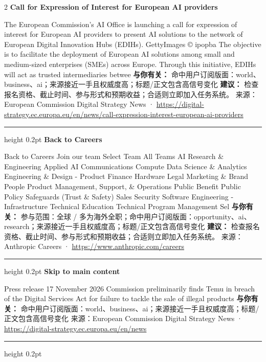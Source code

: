 \documentclass[10.5pt]{ctexart}
\begin{document}
\begin{multicols}{2}
{\large\bfseries Call for Expression of Interest for European AI providers}\par
The European Commission’s AI Office is launching a call for expression of interest for European AI providers to present AI solutions to the network of European Digital Innovation Hubs (EDIHs). GettyImages © ipopba The objective is to facilitate the deployment of European AI solutions among small and medium-sized enterprises (SMEs) across Europe. Through this initiative, EDIHs will act as trusted intermediaries betwee
\textbf{与你有关：} 命中用户订阅版面：world、business、ai；来源接近一手且权威度高；标题/正文包含高信号变化
\textbf{建议：} 检查报名资格、截止时间、参与形式和预期收益；合适则立即加入任务系统。
{\footnotesize\color{ormuted} 来源：European Commission Digital Strategy News · \url{https://digital-strategy.ec.europa.eu/en/news/call-expression-interest-european-ai-providers}}
\vspace{2mm}
\hrule height 0.2pt
\vspace{2mm}
{\large\bfseries Back to Careers}\par
Back to Careers Join our team Select Team All Teams AI Research \& Engineering Applied AI Communications Compute Data Science \& Analytics Engineering \& Design - Product Finance Hardware Legal Marketing \& Brand People Product Management, Support, \& Operations Public Benefit Public Policy Safeguards (Trust \& Safety) Sales Security Software Engineering - Infrastructure Technical Education Technical Program Management Sel
\textbf{与你有关：} 参与范围：全球 / 多为海外全职；命中用户订阅版面：opportunity、ai、research；来源接近一手且权威度高；标题/正文包含高信号变化
\textbf{建议：} 检查报名资格、截止时间、参与形式和预期收益；合适则立即加入任务系统。
{\footnotesize\color{ormuted} 来源：Anthropic Careers · \url{https://www.anthropic.com/careers}}
\vspace{2mm}
\hrule height 0.2pt
\vspace{2mm}
{\large\bfseries Skip to main content}\par
Press release 17 November 2026 Commission preliminarily finds Temu in breach of the Digital Services Act for failure to tackle the sale of illegal products
\textbf{与你有关：} 命中用户订阅版面：world、business、ai；来源接近一手且权威度高；标题/正文包含高信号变化
{\footnotesize\color{ormuted} 来源：European Commission Digital Strategy News · \url{https://digital-strategy.ec.europa.eu/en/news}}
\vspace{2mm}
\hrule height 0.2pt

\end{multicols}
\end{document}
